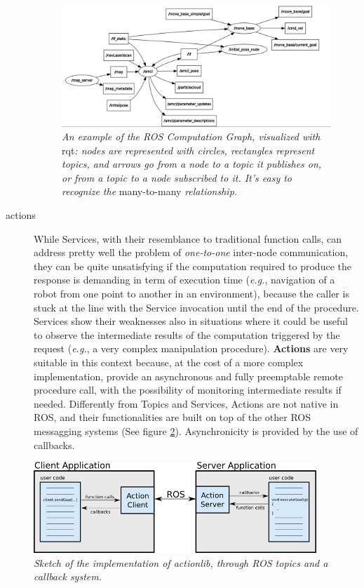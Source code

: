\begin{description}
\begin{figure}
	\centering
	\includegraphics[width=1.1\textwidth]{Images/background_and_tools/rqt_graph.png}
	\caption{\textit{An example of the \ac{ROS} Computation Graph, visualized with} rqt\textit{: nodes are represented with circles, rectangles represent topics, and arrows go from a node to a topic it publishes on, or from a topic to a node subscribed to it. It's easy to recognize the} many-to-many \textit{relationship.}}
	\label{fig:tfComputationGraph}
\end{figure}

\item[actions] While Services, with their resemblance to traditional function calls, can address pretty well the problem of \textit{one-to-one} inter-node communication, they can be quite unsatisfying if the computation required to produce the response is demanding in term of execution time (\textit{e.g.}, navigation of a robot from one point to another in an environment), because the caller is stuck at the line with the Service invocation until the end of the procedure. Services show their weaknesses also in situations where it could be useful to observe the intermediate results of the computation triggered by the request (\textit{e.g.}, a very complex manipulation procedure). \textbf{Actions} are very suitable in this context because, at the cost of a more complex implementation, provide an asynchronous and fully preemptable remote procedure call, with the possibility of monitoring intermediate results if needed. Differently from Topics and Services, Actions are not native in \ac{ROS}, and their functionalities are built on top of the other \ac{ROS} messagging systems (See figure \ref{fig:actionlib}). Asynchronicity is provided by the use of callbacks.
\end{description}

\begin{figure}
	\centering
	\includegraphics[width=0.95\textwidth]{Images/background_and_tools/actionlib.png}
	\caption{\textit{Sketch of the implementation of actionlib, through \ac{ROS} topics and a callback system.}}
	\label{fig:actionlib}
\end{figure}

